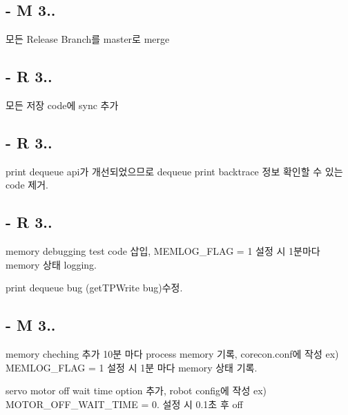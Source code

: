 \subsection*{-\/ M 3..}


\begin{DoxyEnumerate}
\item 모든 Release Branch를 master로 merge
\end{DoxyEnumerate}

\subsection*{-\/ R 3..}


\begin{DoxyEnumerate}
\item 모든 저장 code에 sync 추가
\end{DoxyEnumerate}

\subsection*{-\/ R 3..}


\begin{DoxyEnumerate}
\item print dequeue api가 개선되었으므로 dequeue print backtrace 정보 확인할 수 있는 code 제거.
\end{DoxyEnumerate}

\subsection*{-\/ R 3..}


\begin{DoxyEnumerate}
\item memory debugging test code 삽입, M\-E\-M\-L\-O\-G\-\_\-\-F\-L\-A\-G = 1 설정 시 1분마다 memory 상태 logging.
\item print dequeue bug (get\-T\-P\-Write bug)수정.
\end{DoxyEnumerate}

\subsection*{-\/ M 3..}


\begin{DoxyEnumerate}
\item memory cheching 추가 10분 마다 process memory 기록, corecon.\-conf에 작성 ex) M\-E\-M\-L\-O\-G\-\_\-\-F\-L\-A\-G = 1 설정 시 1분 마다 memory 상태 기록.
\item servo motor off wait time option 추가, robot config에 작성 ex) M\-O\-T\-O\-R\-\_\-\-O\-F\-F\-\_\-\-W\-A\-I\-T\-\_\-\-T\-I\-M\-E = 0. 설정 시 0.\-1초 후 off
\end{DoxyEnumerate}


